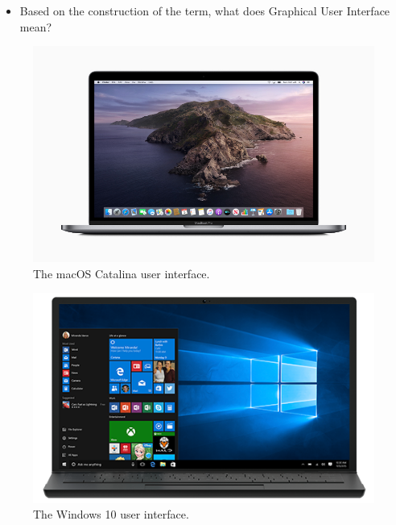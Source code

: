 \begin{frame}
  \begin{exercise}
    \begin{itemize}
      \item Based on the construction of the term, what does Graphical User 
        Interface mean?
    \end{itemize}
  \end{exercise}
\end{frame}

\begin{frame}
  \begin{figure}
    \includegraphics[height=0.8\textheight]{fig/macos.jpg}
    \caption{The macOS Catalina user interface.}
  \end{figure}
\end{frame}

\begin{frame}
  \begin{figure}
    \includegraphics[height=0.8\textheight]{fig/windows10-laptop.png}
    \caption{The Windows 10 user interface.}
  \end{figure}
\end{frame}

